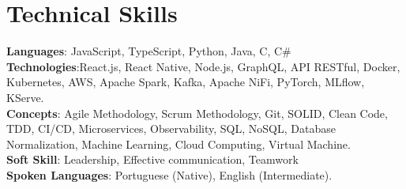 \section{Technical Skills}
\begin{itemize}[leftmargin=0.15in, label={}]
	\small{\item{
	      \textbf{Languages}{: JavaScript, TypeScript, Python, Java, C, C\#} \\
	      \textbf{Technologies}{:React.js, React Native, Node.js, GraphQL, API RESTful, Docker, Kubernetes, AWS, Apache Spark, Kafka, Apache NiFi, PyTorch, MLflow, KServe.} \\
	      \textbf{Concepts}{: Agile Methodology, Scrum Methodology, Git, SOLID, Clean Code, TDD, CI/CD, Microservices, Observability, SQL, NoSQL, Database Normalization, Machine Learning, Cloud Computing, Virtual Machine.}\\
	      \textbf{Soft Skill}{: Leadership, Effective communication, Teamwork}\\
		  \textbf{Spoken Languages}{: Portuguese (Native), English (Intermediate).}
	      }}
\end{itemize}